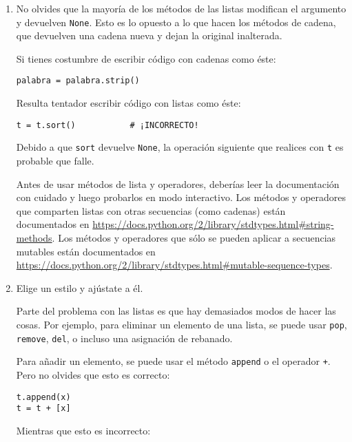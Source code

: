 \begin{enumerate}

\item No olvides que la mayoría de los métodos de las listas modifican el argumento y
devuelven {\tt None}. Esto es lo opuesto a lo que hacen los métodos de cadena,
que devuelven una cadena nueva y dejan la original inalterada.

Si tienes costumbre de escribir código con cadenas como éste:

\beforeverb
\begin{verbatim}
palabra = palabra.strip()
\end{verbatim}
\afterverb

Resulta tentador escribir código con listas como éste:

\beforeverb
\begin{verbatim}
t = t.sort()           # ¡INCORRECTO!
\end{verbatim}
\afterverb


Debido a que {\tt sort} devuelve {\tt None}, la operación
siguiente que realices con {\tt t} es probable que falle.

Antes de usar métodos de lista y operadores, deberías leer la
documentación con cuidado y luego probarlos en modo interactivo. Los
métodos y operadores que comparten listas con otras secuencias (como
cadenas) están documentados en
\url{https://docs.python.org/2/library/stdtypes.html#string-methods}.
Los métodos y operadores que sólo se pueden aplicar a secuencias mutables
están documentados en
\url{https://docs.python.org/2/library/stdtypes.html#mutable-sequence-types}.


\item Elige un estilo y ajústate a él.

Parte del problema con las listas es que hay demasiados
modos de hacer las cosas. Por ejemplo, para eliminar un elemento de
una lista, se puede usar {\tt pop}, {\tt remove}, {\tt del},
o incluso una asignación de rebanado.

Para añadir un elemento, se puede usar el método {\tt append} o
el operador {\tt +}. Pero no olvides que esto es correcto:

\beforeverb
\begin{verbatim}
t.append(x)
t = t + [x]
\end{verbatim}
\afterverb

Mientras que esto es incorrecto:


\end{enumerate}
